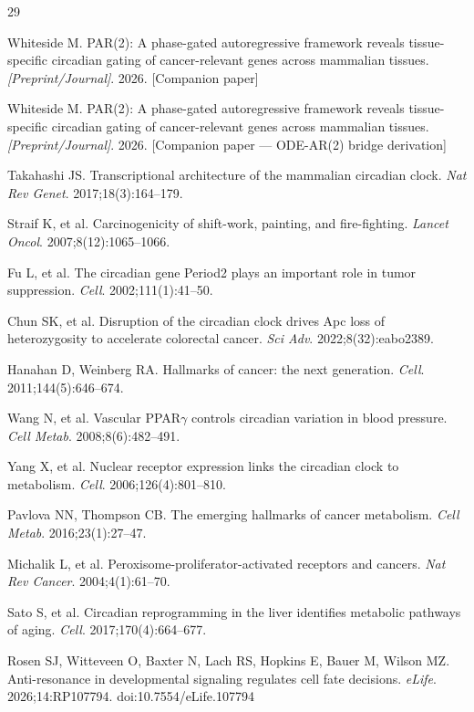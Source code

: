 \documentclass[11pt,letterpaper]{article}
\begin{document}

\begin{thebibliography}{29}

Whiteside M. PAR(2): A phase-gated autoregressive framework reveals tissue-specific circadian gating of cancer-relevant genes across mammalian tissues. \textit{[Preprint/Journal]}. 2026. [Companion paper]

Whiteside M. PAR(2): A phase-gated autoregressive framework reveals tissue-specific circadian gating of cancer-relevant genes across mammalian tissues. \textit{[Preprint/Journal]}. 2026. [Companion paper --- ODE-AR(2) bridge derivation]

Takahashi JS. Transcriptional architecture of the mammalian circadian clock. \textit{Nat Rev Genet}. 2017;18(3):164--179.

Straif K, et al. Carcinogenicity of shift-work, painting, and fire-fighting. \textit{Lancet Oncol}. 2007;8(12):1065--1066.

Fu L, et al. The circadian gene Period2 plays an important role in tumor suppression. \textit{Cell}. 2002;111(1):41--50.

Chun SK, et al. Disruption of the circadian clock drives Apc loss of heterozygosity to accelerate colorectal cancer. \textit{Sci Adv}. 2022;8(32):eabo2389.

Hanahan D, Weinberg RA. Hallmarks of cancer: the next generation. \textit{Cell}. 2011;144(5):646--674.

Wang N, et al. Vascular PPAR$\gamma$ controls circadian variation in blood pressure. \textit{Cell Metab}. 2008;8(6):482--491.

Yang X, et al. Nuclear receptor expression links the circadian clock to metabolism. \textit{Cell}. 2006;126(4):801--810.

Pavlova NN, Thompson CB. The emerging hallmarks of cancer metabolism. \textit{Cell Metab}. 2016;23(1):27--47.

Michalik L, et al. Peroxisome-proliferator-activated receptors and cancers. \textit{Nat Rev Cancer}. 2004;4(1):61--70.

Sato S, et al. Circadian reprogramming in the liver identifies metabolic pathways of aging. \textit{Cell}. 2017;170(4):664--677.

Rosen SJ, Witteveen O, Baxter N, Lach RS, Hopkins E, Bauer M, Wilson MZ. Anti-resonance in developmental signaling regulates cell fate decisions. \textit{eLife}. 2026;14:RP107794. doi:10.7554/eLife.107794


\end{thebibliography}
\end{document}
